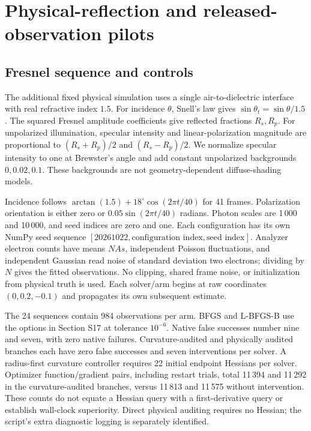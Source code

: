 \section{Physical-reflection and released-observation pilots}
\label{sec:realprotocol}
\subsection{Fresnel sequence and controls}
The additional fixed physical simulation uses a single air-to-dielectric interface with real refractive index $1.5$. For incidence $\theta$, Snell's law gives $\sin\theta_t=\sin\theta/1.5$. The squared Fresnel amplitude coefficients give reflected fractions $R_s,R_p$. For unpolarized illumination, specular intensity and linear-polarization magnitude are proportional to $(R_s+R_p)/2$ and $(R_s-R_p)/2$. We normalize specular intensity to one at Brewster's angle and add constant unpolarized backgrounds $0,0.02,0.1$. These backgrounds are not geometry-dependent diffuse-shading models.

Incidence follows $\arctan(1.5)+18^{\circ}\cos(2\pi t/40)$ for 41 frames. Polarization orientation is either zero or $0.05\sin(2\pi t/40)$ radians. Photon scales are 1\,000 and 10\,000, and seed indices are zero and one. Each configuration has its own NumPy seed sequence $[20261022,\text{configuration index},\text{seed index}]$. Analyzer electron counts have means $NAs$, independent Poisson fluctuations, and independent Gaussian read noise of standard deviation two electrons; dividing by $N$ gives the fitted observations. No clipping, shared frame noise, or initialization from physical truth is used. Each solver/arm begins at raw coordinates $(0,0.2,-0.1)$ and propagates its own subsequent estimate.

The 24 sequences contain 984 observations per arm. BFGS and L-BFGS-B use the options in Section S17 at tolerance $10^{-6}$. Native false successes number nine and seven, with zero native failures. Curvature-audited and physically audited branches each have zero false successes and seven interventions per solver. A radius-first curvature controller requires 22 initial endpoint Hessians per solver. Optimizer function/gradient pairs, including restart trials, total 11\,394 and 11\,292 in the curvature-audited branches, versus 11\,813 and 11\,575 without intervention. These counts do not equate a Hessian query with a first-derivative query or establish wall-clock superiority. Direct physical auditing requires no Hessian; the script's extra diagnostic logging is separately identified.

